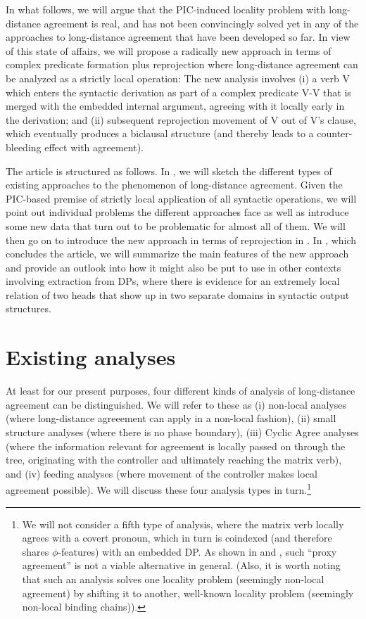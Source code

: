 \documentclass[output=paper
,modfonts
,nonflat]{langsci/langscibook}
\begin{document}
\noindent In what follows, we will argue that the PIC-induced locality problem
	with long-distance agreement is real, and has not been
	convincingly solved yet in any of the approaches to long-distance
	agreement that have been developed so far. In view of this state of
	affairs, we will propose a radically new approach in terms of complex
	predicate formation plus reprojection where long-distance agreement
	can be analyzed as a strictly local operation: The new analysis  involves (i) a verb
	V which enters the syntactic derivation as part of a complex
	predicate V-V that is merged with the embedded internal argument,
	agreeing with it locally early in the derivation; and (ii) subsequent
	reprojection movement of V out of V's clause, which eventually
	produces a biclausal structure (and thereby leads to a
	counter-bleeding effect with agreement). 
	
	The article is structured as follows. In , we will sketch the
	different types of existing approaches to the phenomenon of
	long-distance agreement. Given the PIC-based premise of strictly local
	application of all syntactic operations, we will point out individual
	problems the different approaches face as well as introduce some new
	data that turn out to be problematic for almost all of them. We will
	then go on to introduce the new approach in terms of reprojection in
	. In , which concludes the article, we will
	summarize the main features of the new approach and provide an outlook
	into how it might also be put to use in other contexts involving
	extraction from DPs, where there is evidence for an extremely local
	relation of two heads that show up in two separate domains in
	syntactic output structures.
	
	
	\section{Existing analyses} \label{sec-bjoe-muel:2}
	
	At least for our present purposes, four different kinds of analysis
	of long-distance agreement can be distinguished. We will refer to
	these as (i) non-local analyses (where long-distance agreeement can
	apply in a non-local fashion),  (ii) small structure analyses (where
	there is no phase boundary), (iii) Cyclic Agree analyses (where the
	information relevant for agreement is locally passed on through the
	tree, originating with the controller and ultimately reaching the
	matrix verb), and (iv) feeding analyses (where movement
	of the controller makes 
	local agreement possible). We will discuss these four analysis types in
	turn.\footnote{We will not consider a fifth type of analysis, where
		the matrix verb locally agrees with a covert pronoun, which in turn
		is coindexed (and therefore shares $\phi$-features) with an
		embedded DP. As shown in \citet{PolinskyPotsdam:01} and
		\citet{BhattKeine:16:lon}, such ``proxy agreement'' is not a viable
		alternative in general. (Also, it is worth noting that such an
		analysis solves one locality problem (seemingly non-local agreement)
		by shifting it to another, well-known locality problem (seemingly
		non-local binding chains)).}
	
\end{document}
